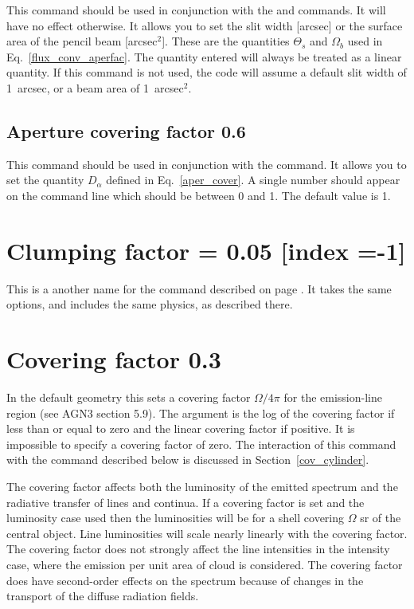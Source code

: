 This command should be used in conjunction with the  and  commands. It will have no
effect otherwise. It allows you to set the slit width [arcsec] or the surface
area of the pencil beam [arcsec$^2$]. These are the quantities $\Theta_s$ and
$\Omega_b$ used in Eq.~\ref{flux_conv_aperfac}. The quantity entered will
always be treated as a linear quantity. If this command is not used, the code
will assume a default slit width of 1~arcsec, or a beam area of 1~arcsec$^2$.

\subsection{Aperture covering factor 0.6}

This command should be used in conjunction with the  command. It allows you to set the quantity $D_\alpha$ defined in
Eq.~\ref{aper_cover}. A single number should appear on the command line
which should be between 0 and 1. The default value is 1.

\section{Clumping factor = 0.05 [index =-1]}
This is a another name for the
 command described on
page \pageref{sec:CommandFillingFactor}.
It takes the same options, and includes the same physics,
as described there.

\section{Covering factor 0.3}
\label{cov_factor}

In the default geometry this sets a covering factor $\Omega/4\pi$ for the emission-line region
(see AGN3 section 5.9).
The argument is the log of the covering factor
if less than or equal to zero and the linear covering factor if positive.
It is impossible to specify a covering factor of zero. The interaction of
this command with the  command described below is
discussed in Section~\ref{cov_cylinder}.

The covering factor affects both the luminosity of the emitted spectrum
and the radiative transfer of lines and continua.
If a covering factor
is set and the luminosity case used then the luminosities
will be for a shell covering $\Omega$ sr of the central object.
Line luminosities
will scale nearly linearly with the covering factor.
The covering factor
does not strongly affect the line intensities in the intensity case, where
the emission per unit area of cloud is considered.
The covering factor
does have second-order effects on the spectrum because of changes in the
transport of the diffuse radiation fields.

